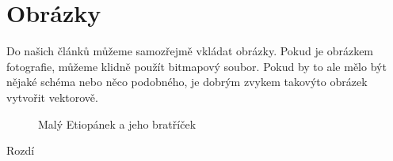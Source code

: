 \documentclass[a4paper, 11pt, ]{article}
\begin{document}
\section{Obrázky}
Do našich článků můžeme samozřejmě vkládat obrázky. Pokud je obrázkem fotografie,
můžeme klidně použít bitmapový soubor. Pokud by to ale mělo být nějaké schéma nebo
něco podobného, je dobrým zvykem takovýto obrázek vytvořit vektorově.
\begin{figure}[htb]
\caption{Malý Etiopánek a jeho bratříček}
\label{obr-etiopan}
\end{figure}
\newpage
Rozdí
\end{document}
